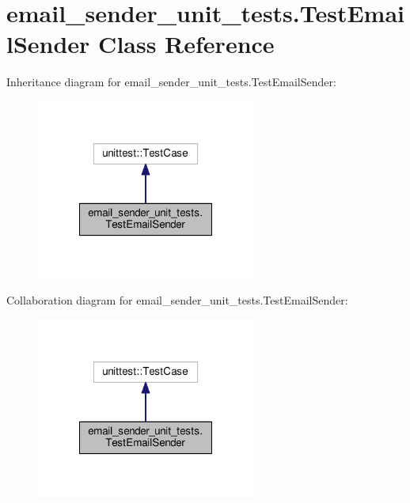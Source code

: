 \hypertarget{classemail__sender__unit__tests_1_1TestEmailSender}{\section{email\-\_\-sender\-\_\-unit\-\_\-tests.\-Test\-Email\-Sender Class Reference}
\label{classemail__sender__unit__tests_1_1TestEmailSender}
}


Inheritance diagram for email\-\_\-sender\-\_\-unit\-\_\-tests.\-Test\-Email\-Sender\-:
\nopagebreak
\begin{figure}[H]
\begin{center}
\leavevmode
\includegraphics[width=204pt]{classemail__sender__unit__tests_1_1TestEmailSender__inherit__graph}
\end{center}
\end{figure}


Collaboration diagram for email\-\_\-sender\-\_\-unit\-\_\-tests.\-Test\-Email\-Sender\-:
\nopagebreak
\begin{figure}[H]
\begin{center}
\leavevmode
\includegraphics[width=204pt]{classemail__sender__unit__tests_1_1TestEmailSender__coll__graph}
\end{center}
\end{figure}
